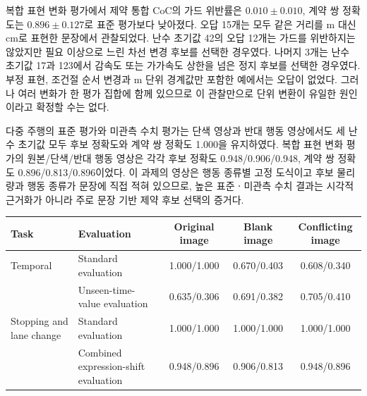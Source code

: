 복합 표현 변화 평가에서 제약 통합 CoC의 가드 위반률은 $0.010\pm0.010$, 계약 쌍 정확도는 $0.896\pm0.127$로 표준 평가보다 낮아졌다. 오답 15개는 모두 같은 거리를 m 대신 cm로 표현한 문장에서 관찰되었다. 난수 초기값 42의 오답 12개는 가드를 위반하지는 않았지만 필요 이상으로 느린 차선 변경 후보를 선택한 경우였다. 나머지 3개는 난수 초기값 17과 123에서 감속도 또는 가가속도 상한을 넘은 정지 후보를 선택한 경우였다. 부정 표현, 조건절 순서 변경과 m 단위 경계값만 포함한 예에서는 오답이 없었다. 그러나 여러 변화가 한 평가 집합에 함께 있으므로 이 관찰만으로 단위 변환이 유일한 원인이라고 확정할 수는 없다.

다중 주행의 표준 평가와 미관측 수치 평가는 단색 영상과 반대 행동 영상에서도 세 난수 초기값 모두 후보 정확도와 계약 쌍 정확도 1.000을 유지하였다. 복합 표현 변화 평가의 원본/단색/반대 행동 영상은 각각 후보 정확도 0.948/0.906/0.948, 계약 쌍 정확도 0.896/0.813/0.896이었다. 이 과제의 영상은 행동 종류별 고정 도식이고 후보 물리량과 행동 종류가 문장에 직접 적혀 있으므로, 높은 표준ㆍ미관측 수치 결과는 시각적 근거화가 아니라 주로 문장 기반 제약 후보 선택의 증거다.

\begin{table}[!t]
\centering
{}
\label{tab:image-ablation}
\footnotesize
\begin{tabular}{llccc}
\toprule
Task & Evaluation & Original image & Blank image & Conflicting image \\
\midrule
Temporal & Standard evaluation & 1.000/1.000 & 0.670/0.403 & 0.608/0.340 \\
 & Unseen-time-value evaluation & 0.635/0.306 & 0.691/0.382 & 0.705/0.410 \\
Stopping and lane change & Standard evaluation & 1.000/1.000 & 1.000/1.000 & 1.000/1.000 \\
 & Combined expression-shift evaluation & 0.948/0.896 & 0.906/0.813 & 0.948/0.896 \\
\bottomrule
\end{tabular}
\end{table}

